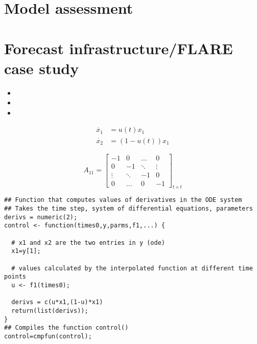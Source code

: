 \documentclass[12pt, oneside]{article}   	%
\begin{document}
\section{Model assessment}

\section{Forecast infrastructure/FLARE case study}


\begin{itemize}
\item 

\item 

\item 

\end{itemize}

\begin{align}
\dot{x_1} & = u(t) x_1 \nonumber \\
\dot{x_2} & = (1-u(t)) x_1 
\end{align}

\begin{equation}
A_{11}=
  \begin{bmatrix}
    -1		& 0 	 	& \ldots 	& 0  	 \\
    0 	 	& -1  	& \ddots 	& \vdots  \\
    \vdots   & \ddots 	& -1		& 0  \\
    0 		& \ldots 	& 0 		& -1  
  \end{bmatrix}_{ t \times t}
\end{equation}

\begin{lstlisting}
## Function that computes values of derivatives in the ODE system
## Takes the time step, system of differential equations, parameters
derivs = numeric(2); 
control <- function(times0,y,parms,f1,...) {
  
  # x1 and x2 are the two entries in y (ode)
  x1=y[1]; 
  
  # values calculated by the interpolated function at different time points
  u <- f1(times0);
  
  derivs = c(u*x1,(1-u)*x1) 
  return(list(derivs));
}
## Compiles the function control()
control=cmpfun(control); 
\end{lstlisting}

\clearpage
\nocite{*}

 

\end{document}
